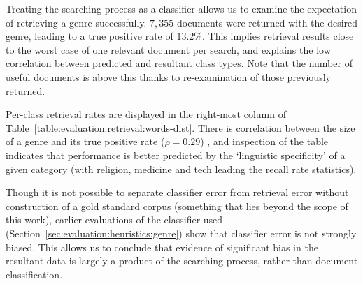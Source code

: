 
Treating the searching process as a classifier allows us to examine the expectation of retrieving a genre successfully.  $7,355$ documents were returned with the desired genre, leading to a true positive rate of $13.2\%$.  This implies retrieval results close to the worst case of one relevant document per search, and explains the low correlation between predicted and resultant class types.  Note that the number of useful documents is above this thanks to re-examination of those previously returned.

Per-class retrieval rates are displayed in the right-most column of Table~\ref{table:evaluation:retrieval:words-dist}.  There is correlation between the size of a genre and its true positive rate ($\rho = 0.29$)%
, and inspection of the table indicates that performance is better predicted by the `linguistic specificity' of a given category (with religion, medicine and tech leading the recall rate statistics).

Though it is not possible to separate classifier error from retrieval error without construction of a gold standard corpus (something that lies beyond the scope of this work), earlier evaluations of the classifier used (Section~\ref{sec:evaluation:heuristics:genre}) show that classifier error is not strongly biased.  This allows us to conclude that evidence of significant bias in the resultant data is largely a product of the searching process, rather than document classification.





